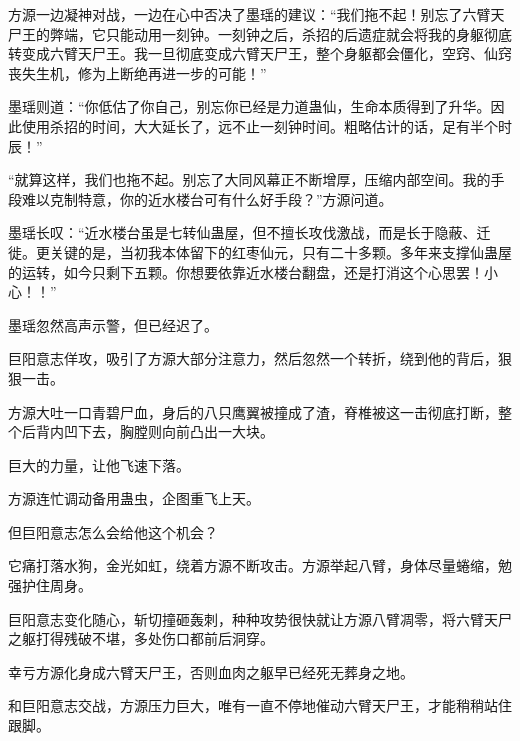 \begin{this_body}
方源一边凝神对战，一边在心中否决了墨瑶的建议：“我们拖不起！别忘了六臂天尸王的弊端，它只能动用一刻钟。一刻钟之后，杀招的后遗症就会将我的身躯彻底转变成六臂天尸王。我一旦彻底变成六臂天尸王，整个身躯都会僵化，空窍、仙窍丧失生机，修为上断绝再进一步的可能！”

墨瑶则道：“你低估了你自己，别忘你已经是力道蛊仙，生命本质得到了升华。因此使用杀招的时间，大大延长了，远不止一刻钟时间。粗略估计的话，足有半个时辰！”

“就算这样，我们也拖不起。别忘了大同风幕正不断增厚，压缩内部空间。我的手段难以克制特意，你的近水楼台可有什么好手段？”方源问道。

墨瑶长叹：“近水楼台虽是七转仙蛊屋，但不擅长攻伐激战，而是长于隐蔽、迁徙。更关键的是，当初我本体留下的红枣仙元，只有二十多颗。多年来支撑仙蛊屋的运转，如今只剩下五颗。你想要依靠近水楼台翻盘，还是打消这个心思罢！小心！！”

墨瑶忽然高声示警，但已经迟了。

巨阳意志佯攻，吸引了方源大部分注意力，然后忽然一个转折，绕到他的背后，狠狠一击。

方源大吐一口青碧尸血，身后的八只鹰翼被撞成了渣，脊椎被这一击彻底打断，整个后背内凹下去，胸膛则向前凸出一大块。

巨大的力量，让他飞速下落。

方源连忙调动备用蛊虫，企图重飞上天。

但巨阳意志怎么会给他这个机会？

它痛打落水狗，金光如虹，绕着方源不断攻击。方源举起八臂，身体尽量蜷缩，勉强护住周身。

巨阳意志变化随心，斩切撞砸轰刺，种种攻势很快就让方源八臂凋零，将六臂天尸之躯打得残破不堪，多处伤口都前后洞穿。

幸亏方源化身成六臂天尸王，否则血肉之躯早已经死无葬身之地。

和巨阳意志交战，方源压力巨大，唯有一直不停地催动六臂天尸王，才能稍稍站住跟脚。

\end{this_body}

